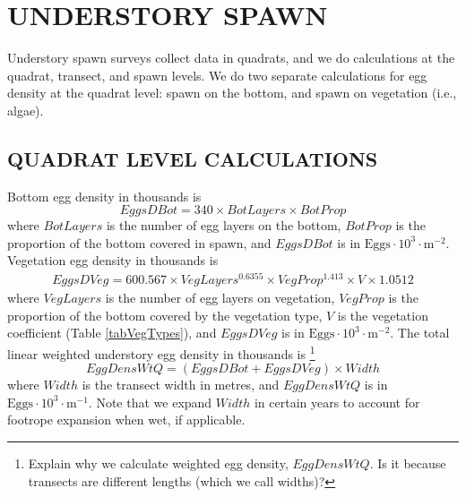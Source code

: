 \documentclass[12pt]{article}
\begin{document}
\section{UNDERSTORY SPAWN}

Understory spawn surveys collect data in quadrats, and we do calculations at the quadrat, transect, and spawn levels.
We do two separate calculations for egg density at the quadrat level: spawn on the bottom, and spawn on vegetation (i.e., algae).

\subsection{QUADRAT LEVEL CALCULATIONS}

Bottom egg density in thousands is \citep{HaegeleEtal1979}
\begin{equation}
EggsDBot = 340 \times BotLayers \times BotProp
\label{eqEggDensUnderB}
\end{equation}
where $BotLayers$ is the number of egg layers on the bottom, $BotProp$ is the proportion of the bottom covered in spawn, and $EggsDBot$ is in $\text{Eggs} \cdot 10^{3} \cdot \text{m}^{-2}$.
Vegetation egg density in thousands is \citep{Schweigert2005}
\begin{multline}
EggsDVeg = 600.567 \times VegLayers^{0.6355} \times VegProp^{1.413} \times V \times 1.0512
\label{eqEggDensUnderV}
\end{multline}
where $VegLayers$ is the number of egg layers on vegetation, $VegProp$ is the proportion of the bottom covered by the vegetation type, $V$ is the vegetation coefficient (Table \ref{tabVegTypes}), and $EggsDVeg$ is in $\text{Eggs} \cdot 10^{3} \cdot \text{m}^{-2}$.
The total linear weighted understory egg density in thousands is%
\footnote{Explain why we calculate weighted egg density, $EggDensWtQ$.
Is it because transects are different lengths (which we call widths)?}
\begin{equation}
EggDensWtQ = \left( EggsDBot + EggsDVeg \right) \times Width
\label{eqEggDensWtUnder}
\end{equation}
where $Width$ is the transect width in metres, and $EggDensWtQ$ is in $\text{Eggs} \cdot 10^{3} \cdot \text{m}^{-1}$.
Note that we expand $Width$ in certain years to account for footrope expansion when wet, if applicable.
\end{document}
